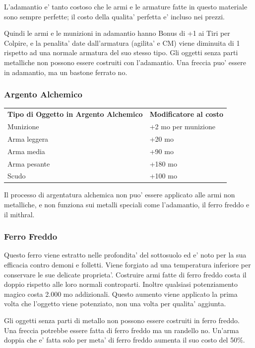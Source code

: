 \documentclass[a4paper,11pt,twoside,openany]{book}
\begin{document}
{L'adamantio e' tanto costoso che le armi e le armature fatte in questo materiale sono sempre perfette; il costo della qualita' perfetta e' incluso nei prezzi.

Quindi le armi e le munizioni in adamantio hanno Bonus di +1 ai Tiri per Colpire, e la penalita' date dall'armatura (agilita' e CM) viene diminuita di 1 rispetto ad una normale armatura del suo stesso tipo. Gli oggetti senza parti metalliche non possono essere costruiti con l'adamantio. Una freccia puo' essere in adamantio, ma un bastone ferrato
no.

\subsubsection{Argento Alchemico}

\label{argento-alchemico}

\begin{tabular}{ll}
\toprule
\textbf{Tipo di Oggetto in Argento Alchemico} & \textbf{Modificatore al costo}\tabularnewline
Munizione & +2 mo per munizione\tabularnewline
Arma leggera & +20 mo\tabularnewline
Arma media & +90 mo\tabularnewline
Arma pesante & +180 mo\tabularnewline
Scudo & +100 mo\tabularnewline
\end{tabular}

Il processo di argentatura alchemica non puo' essere applicato alle armi non metalliche, e non funziona sui metalli speciali come l'adamantio, il ferro freddo e il mithral.

\subsubsection{Ferro Freddo}

\label{ferro-freddo}

Questo ferro viene estratto nelle profondita' del sottosuolo ed e' noto per la sua efficacia contro demoni e folletti. Viene forgiato ad una temperatura inferiore per conservare le sue delicate proprieta'. Costruire armi fatte di ferro freddo costa il doppio rispetto alle loro normali controparti. Inoltre qualsiasi potenziamento magico costa 2.000 mo addizionali. Questo aumento viene applicato la prima volta che l'oggetto viene potenziato, non una volta per qualita' aggiunta. 

Gli oggetti senza parti di metallo non possono essere costruiti in ferro freddo. Una freccia potrebbe essere fatta di ferro freddo ma un randello no. Un'arma doppia che e' fatta solo per meta' di ferro freddo aumenta il suo costo del 50\%.

}
\end{document}

